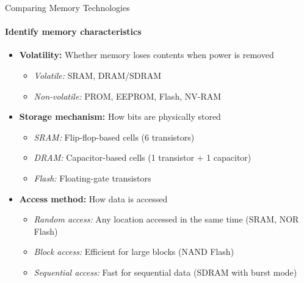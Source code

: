 \begin{KR}{Comparing Memory Technologies}\\
\paragraph{Identify memory characteristics}
\begin{itemize}
    \item \textbf{Volatility:} Whether memory loses contents when power is removed
    \begin{itemize}
        \item \textit{Volatile:} SRAM, DRAM/SDRAM
        \item \textit{Non-volatile:} PROM, EEPROM, Flash, NV-RAM
    \end{itemize}
    \item \textbf{Storage mechanism:} How bits are physically stored
    \begin{itemize}
        \item \textit{SRAM:} Flip-flop-based cells (6 transistors)
        \item \textit{DRAM:} Capacitor-based cells (1 transistor + 1 capacitor)
        \item \textit{Flash:} Floating-gate transistors
    \end{itemize}
    \item \textbf{Access method:} How data is accessed
    \begin{itemize}
        \item \textit{Random access:} Any location accessed in the same time (SRAM, NOR Flash)
        \item \textit{Block access:} Efficient for large blocks (NAND Flash)
        \item \textit{Sequential access:} Fast for sequential data (SDRAM with burst mode)
    \end{itemize}
\end{itemize}


\end{KR}

